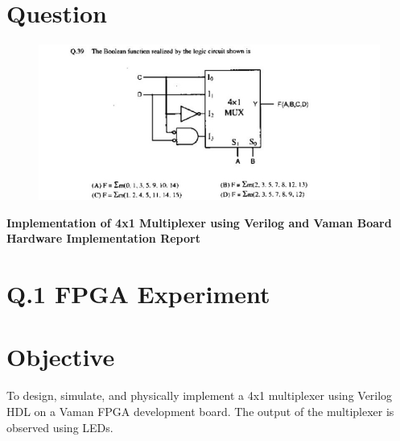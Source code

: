 \documentclass[a4paper,12pt]{article}
\begin{document}
\pagestyle{fancy}
\fancyhf{}

\section*{Question}
\begin{figure}[H]
 \centering
 \includegraphics[width=0.8\linewidth]{question.jpg}
\end{figure}


\begin{center}
    \Huge\textbf{Implementation of 4x1 Multiplexer using Verilog and Vaman Board}\\[1em]
    \Large\textbf{Hardware Implementation Report}\\[1em]
\end{center}
\section*{Q.1 FPGA  Experiment}
\section*{Objective}
To design, simulate, and physically implement a 4x1 multiplexer using Verilog HDL on a Vaman FPGA development board. The output of the multiplexer is observed using LEDs.
\end{document}
